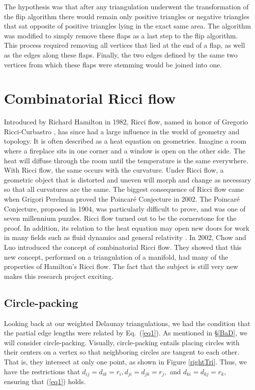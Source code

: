 \documentclass[12pt]{article}
\begin{document}
 The hypothesis was that after any triangulation underwent the transformation of the flip algorithm there would remain only positive triangles or negative triangles that sat opposite of positive triangles lying in the exact same area. The algorithm was modified to simply remove these flaps as a last step to the flip algorithm. This process required removing all vertices that lied at the end of a flap, as well as the edges along these flaps. Finally, the two edges defined by the same two vertices from which these flaps were stemming would be joined into one.

\section{Combinatorial Ricci flow}
\label{RBk}

Introduced by Richard Hamilton in 1982, Ricci flow, named in honor of Gregorio Ricci-Curbastro \cite{RicciBkgd}, has since had a large influence in the world of geometry and topology. It is often described as a heat equation on geometries. Imagine a room where a fireplace sits in one corner and a window is open on the other side. The heat will diffuse through the room until the temperature is the same everywhere. With Ricci flow, the same occurs with the curvature. Under Ricci flow, a geometric object that is distorted and uneven will morph and change as necessary so that all curvatures are the same. The biggest consequence of Ricci flow came when Grigori Perelman proved the Poincar\'{e} Conjecture in 2002. The Poincar\'{e} Conjecture, proposed in 1904, was particularly difficult to prove, and was one of seven millennium puzzles. Ricci flow turned out to be the cornerstone for the proof. In addition, its relation to the heat equation may open new doors for work in many fields such as fluid dynamics and general relativity \cite{RicciBkgd}. In 2002, Chow and Luo introduced the concept of combinatorial Ricci flow. They showed that this new concept, performed on a triangulation of a manifold, had many of the properties of Hamilton's Ricci flow. The fact that the subject is still very new makes this research project exciting. 

\subsection{Circle-packing}

 Looking back at our weighted Delaunay triangulations, we had the condition that the partial edge lengths were related by Eq.~(\ref{eq1}). As mentioned in \S\ref{BaD}, we will consider circle-packing. Visually, circle-packing entails placing circles with their centers on a vertex so that neighboring circles are tangent to each other. That is, they intersect at only one point, as shown in Figure \ref{rightTri}. Thus, we have the restrictions that $d_{ij} = d_{ik} = r_i, d_{ji} = d_{jk} = r_j,$ and $d_{ki} = d_{kj} = r_k$, ensuring that (\ref{eq1}) holds.
\end{document}

